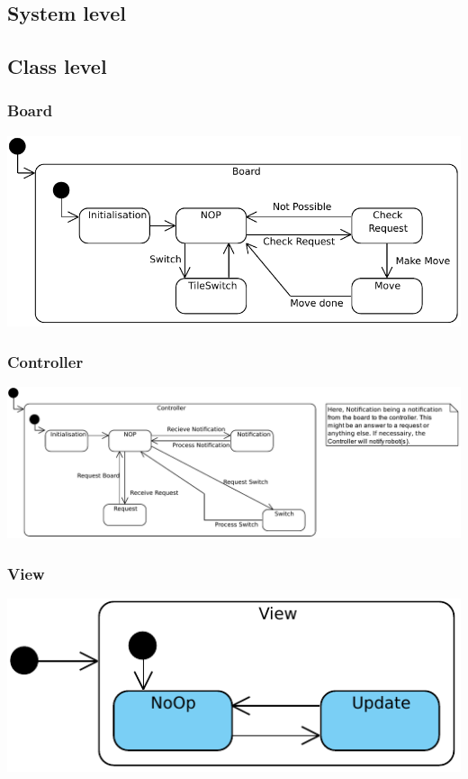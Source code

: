 \subsection{System level}


\subsection{Class level}
	\subsubsection{Board} 
		\includegraphics[width=\linewidth]{statecharts/board.pdf}
	\subsubsection{Controller}
		\includegraphics[width=\linewidth]{statecharts/controller.pdf}
	\subsubsection{View}
		\includegraphics[width=\linewidth]{statecharts/view.pdf}
